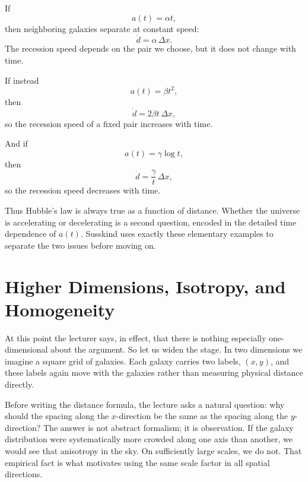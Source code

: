 If
\begin{equation}
a(t)=\alpha t,
\end{equation}
then neighboring galaxies separate at constant speed:
\begin{equation}
\dot d=\alpha\,\Delta x.
\end{equation}
The recession speed depends on the pair we choose, but it does not change with time.

If instead
\begin{equation}
a(t)=\beta t^2,
\end{equation}
then
\begin{equation}
\dot d=2\beta t\,\Delta x,
\end{equation}
so the recession speed of a fixed pair increases with time.

And if
\begin{equation}
a(t)=\gamma \log t,
\end{equation}
then
\begin{equation}
\dot d=\frac{\gamma}{t}\,\Delta x,
\end{equation}
so the recession speed decreases with time.

Thus Hubble's law is always true as a function of distance. Whether the universe is accelerating or decelerating is a second question, encoded in the detailed time dependence of \(a(t)\). Susskind uses exactly these elementary examples to separate the two issues before moving on.

\section{Higher Dimensions, Isotropy, and Homogeneity}

At this point the lecturer says, in effect, that there is nothing especially one-dimensional about the argument. So let us widen the stage. In two dimensions we imagine a square grid of galaxies. Each galaxy carries two labels, \((x,y)\), and these labels again move with the galaxies rather than measuring physical distance directly.

Before writing the distance formula, the lecture asks a natural question: why should the spacing along the \(x\)-direction be the same as the spacing along the \(y\)-direction? The answer is not abstract formalism; it is observation. If the galaxy distribution were systematically more crowded along one axis than another, we would see that anisotropy in the sky. On sufficiently large scales, we do not. That empirical fact is what motivates using the same scale factor in all spatial directions.

